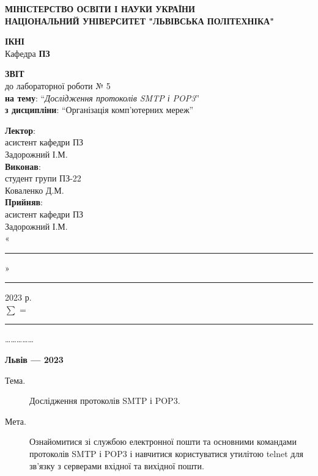 \documentclass{article}
\newcommand\subject{Організація комп’ютерних мереж}
\newcommand\lecturer{асистент кафедри ПЗ \\ Задорожний І.М.}
\newcommand\teacher{асистент кафедри ПЗ \\ Задорожний І.М.}
\newcommand\mygroup{ПЗ-22}
\newcommand\lab{5}
\newcommand\theme{Дослідження протоколів SMTP і POP3}
\newcommand\purpose{Ознайомитися зі службою електронної пошти та основними командами протоколів SMTP і POP3 і навчитися користуватися утилітою telnet для зв’язку з серверами вхідної та вихідної пошти}
\begin{document}
\begin{normalsize}
	\begin{titlepage}
		\thispagestyle{empty}
		\begin{center}
			\textbf{МІНІСТЕРСТВО ОСВІТИ І НАУКИ УКРАЇНИ\\
				НАЦІОНАЛЬНИЙ УНІВЕРСИТЕТ "ЛЬВІВСЬКА ПОЛІТЕХНІКА"}
		\end{center}
		\begin{flushright}
			\textbf{ІКНІ}\\
			Кафедра \textbf{ПЗ}
		\end{flushright}
		\vspace{200pt}
		\begin{center}
			\textbf{ЗВІТ}\\
			\vspace{10pt}
			до лабораторної роботи № \lab\\
			\textbf{на тему}: “\textit{\theme}”\\
			\textbf{з дисципліни}: “\subject”
		\end{center}
		\vspace{112pt}
		\begin{flushright}
			
			\textbf{Лектор}:\\
			\lecturer\\
			\vspace{28pt}
			\textbf{Виконав}:\\
			
			студент групи \mygroup\\
			Коваленко Д.М.\\
			\vspace{28pt}
			\textbf{Прийняв}:\\
			
			\teacher\\
			
			\vspace{28pt}
			«\rule{1cm}{0.15mm}» \rule{1.5cm}{0.15mm} 2023 р.\\
			$\sum$ = \rule{1cm}{0.15mm}……………\\
			
		\end{flushright}
		\vspace{\fill}
		\begin{center}
			\textbf{Львів — 2023}
		\end{center}
	\end{titlepage}
		
	\begin{description}
		\item[Тема.] \theme.
		\item[Мета.] \purpose.
	\end{description}


\end{normalsize}
\end{document}
